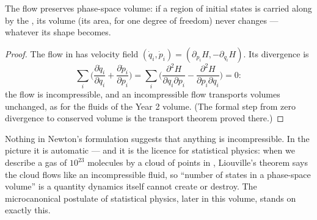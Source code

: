 \begin{theorem}\label{thm:b3:hamiltonian-mechanics:liouville}
The  flow preserves phase-space volume: if a region of
initial states is carried along by the , its volume
(its area, for one degree of freedom) never changes --- whatever its
shape becomes.
\end{theorem}

\begin{proof}
The flow in  has velocity field $(\dot q_i, \dot p_i) =
(\partial_{p_i}H, -\partial_{q_i}H)$. Its divergence is
\[
\sum_i\Big(\frac{\partial\dot q_i}{\partial q_i}
 + \frac{\partial\dot p_i}{\partial p_i}\Big)
 = \sum_i\Big(\frac{\partial^2H}{\partial q_i\partial p_i}
 - \frac{\partial^2H}{\partial p_i\partial q_i}\Big) = 0 :
\]
the flow is incompressible, and an incompressible flow transports
volumes unchanged, as for the fluids of the Year 2 volume. (The
formal step from zero divergence to conserved volume is the transport
theorem proved there.)
\end{proof}

\begin{remark}\label{rem:b3:hamiltonian-mechanics:liouville-matters}
Nothing in Newton's formulation suggests that anything is
incompressible. In the  picture it is automatic --- and it
is the licence for statistical physics: when we describe a gas of
$10^{23}$ molecules by a cloud of points in , Liouville's
theorem says the cloud flows like an incompressible fluid, so
``number of states in a phase-space volume'' is a quantity dynamics
itself cannot create or destroy. The microcanonical postulate of
statistical physics, later in this volume, stands on exactly this.
\end{remark}

